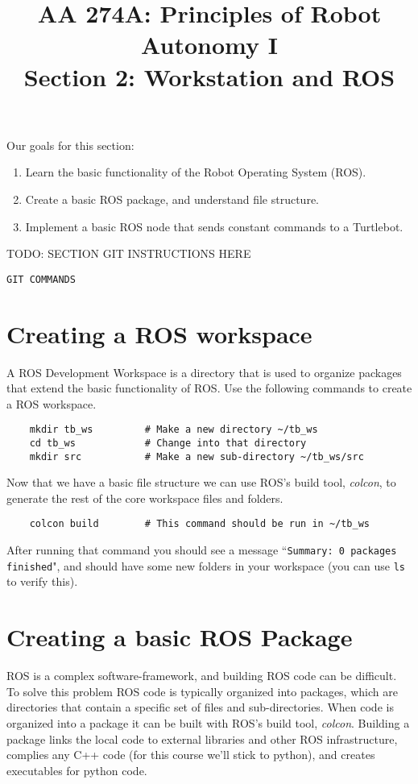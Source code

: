\documentclass{article}
\title{AA 274A: Principles of Robot Autonomy I \\ Section 2: Workstation and ROS}
\date{}
\begin{document}
\maketitle
\pagestyle{fancy}

Our goals for this section:
\begin{enumerate}
    \item Learn the basic functionality of the Robot Operating System (ROS). 
    \item Create a basic ROS package, and understand file structure.
    \item Implement a basic ROS node that sends constant commands to a Turtlebot.
\end{enumerate}

TODO: SECTION GIT INSTRUCTIONS HERE
\begin{lstlisting}
GIT COMMANDS
\end{lstlisting}

\section{Creating a ROS workspace}
A ROS Development Workspace is a directory that is used to organize packages that extend the basic functionality of ROS. Use the following commands to create a ROS workspace.

\begin{lstlisting}
    mkdir tb_ws         # Make a new directory ~/tb_ws
    cd tb_ws            # Change into that directory 
    mkdir src           # Make a new sub-directory ~/tb_ws/src
\end{lstlisting}

Now that we have a basic file structure we can use ROS's build tool, {\it colcon}, to generate the rest of the core workspace files and folders. 

\begin{lstlisting}
    colcon build        # This command should be run in ~/tb_ws
\end{lstlisting}

After running that command you should see a message ``\texttt{Summary: 0 packages finished}", and should have some new folders in your workspace (you can use \texttt{ls} to verify this).



\section{Creating a basic ROS Package}
ROS is a complex software-framework, and building ROS code can be difficult. To solve this problem ROS code is typically organized into packages, which are directories that contain a specific set of files and sub-directories. When code is organized into a package it can be built with ROS's build tool, {\it colcon}. Building a package links the local code to external libraries and other ROS infrastructure, complies any C++ code (for this course we'll stick to python), and creates executables for python code. 
\begin{lstlisting}
    
\end{lstlisting}
\end{document}
